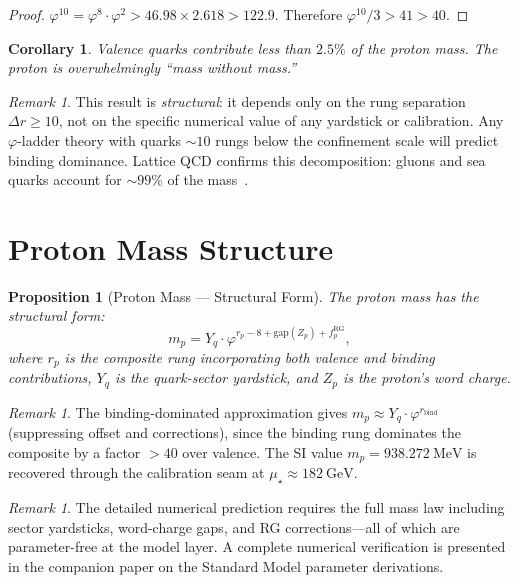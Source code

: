 \documentclass[12pt,a4paper]{article}
\newtheorem{corollary}[theorem]{Corollary}
\newtheorem{proposition}[theorem]{Proposition}
\theoremstyle{definition}
\theoremstyle{remark}
\newtheorem{remark}[theorem]{Remark}
\begin{document}
\begin{proof}
$\varphi^{10} = \varphi^8 \cdot \varphi^2 > 46.98 \times
2.618 > 122.9$.  Therefore $\varphi^{10}/3 > 41 > 40$.
\end{proof}

\begin{corollary}
Valence quarks contribute less than $2.5\%$ of the proton
mass.  The proton is overwhelmingly ``mass without mass.''
\end{corollary}

\begin{remark}
This result is \emph{structural}: it depends only on the
rung separation $\Delta r \geq 10$, not on the specific
numerical value of any yardstick or calibration.  Any
$\varphi$-ladder theory with quarks $\sim 10$ rungs below
the confinement scale will predict binding dominance.
Lattice QCD confirms this decomposition: gluons and
sea quarks account for $\sim 99\%$ of the
mass~\cite{LatticeQCD}.
\end{remark}

\section{Proton Mass Structure}
\label{sec:full}

\begin{proposition}[Proton Mass --- Structural Form]
\label{thm:proton}
The proton mass has the structural form:
\begin{equation}
  \boxed{m_p = Y_q \cdot \varphi^{r_p - 8 +
  \mathrm{gap}(Z_p) + f^{\mathrm{RG}}_p},}
\end{equation}
where $r_p$ is the composite rung incorporating both
valence and binding contributions, $Y_q$ is the quark-sector
yardstick, and $Z_p$ is the proton's word charge.
\end{proposition}

\begin{remark}
The binding-dominated approximation gives
$m_p \approx Y_q \cdot \varphi^{r_{\mathrm{bind}}}$
(suppressing offset and corrections), since the binding
rung dominates the composite by a factor $> 40$ over
valence.  The SI value $m_p = 938.272~\mathrm{MeV}$ is
recovered through the calibration seam at
$\mu_\star \approx 182~\mathrm{GeV}$.
\end{remark}

\begin{remark}
The detailed numerical prediction requires the full mass
law including sector yardsticks, word-charge gaps, and
RG corrections---all of which are parameter-free at the
model layer.  A complete numerical verification is
presented in the companion paper on the Standard Model
parameter derivations.
\end{remark}
\end{document}
